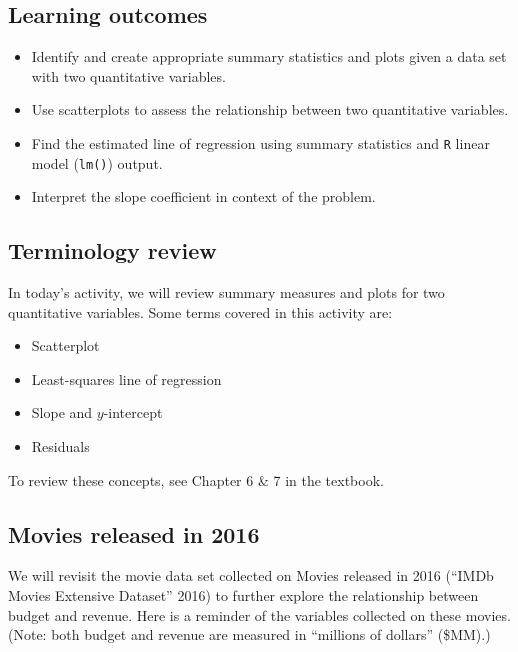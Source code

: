 \documentclass[
]{report}
\begin{document}

\hypertarget{learning-outcomes-8}{%
\subsection{Learning outcomes}\label{learning-outcomes-8}}

\begin{itemize}
\item
  Identify and create appropriate summary statistics and plots
  given a data set with two quantitative variables.
\item
  Use scatterplots to assess the relationship between two quantitative variables.
\item
  Find the estimated line of regression using summary statistics and \texttt{R} linear model (\texttt{lm()}) output.
\item
  Interpret the slope coefficient in context of the problem.
\end{itemize}

\hypertarget{terminology-review-8}{%
\subsection{Terminology review}\label{terminology-review-8}}

In today's activity, we will review summary measures and plots for two quantitative variables. Some terms covered in this activity are:

\begin{itemize}
\item
  Scatterplot
\item
  Least-squares line of regression
\item
  Slope and \(y\)-intercept
\item
  Residuals
\end{itemize}

To review these concepts, see Chapter 6 \& 7 in the textbook.

\hypertarget{movies-released-in-2016-2}{%
\subsection{Movies released in 2016}\label{movies-released-in-2016-2}}

We will revisit the movie data set collected on Movies released in 2016 ({``{IMDb} Movies Extensive Dataset''} 2016) to further explore the relationship between budget and revenue. Here is a reminder of the variables collected on these movies. (Note: both budget and revenue are measured in ``millions of dollars'' (\$MM).)
\end{document}
